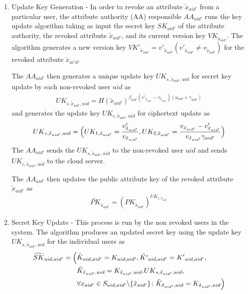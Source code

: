 \begin{enumerate}
	
	\begin{enumerate}
		\item Update Key Generation - In order to revoke an attribute $\tilde{x}_{aid'}$ from a particular user, the attribute authority (AA) responsible $AA_{aid'}$ runs the key update algorithm taking as input the secret key $SK_{aid'}$ of the 
		attribute authority, the revoked attribute $\tilde{x}_{aid'}$, and its current version key $VK_{\tilde{x}_{aid'}}$.
		The algorithm generates a new version key $VK'_{\tilde{x}_{aid'}} = v'_{\tilde{x}_{aid'}} (v'_{\tilde{x}_{aid'}} \neq v_{\tilde{x}_{aid'}})$ for the revoked attribute $\tilde{x}_{ai'd}$.
		
		The $AA_{aid'}$ then generates a unique update key ${UK}_{s,\tilde{x}_{aid'},uid}$ for secret key update by each non-revoked user $uid$ as
		\begin{align*}
		{UK}_{s,\tilde{x}_{aid'},uid} = H(\tilde{x}_{aid'})^{\beta_{aid'}(v'_{\tilde{x}_{aid'}}-v_{\tilde{x}_{aid'}})(u_{uid}+\gamma_{aid'})}
		\end{align*}
		and generates the update key ${UK}_{c,\tilde{x}_{aid'},uid}$ for ciphertext update as
		\begin{align*}
		{UK}_{c,\tilde{x}_{aid'},uid} =\Bigl( UK_{1,\tilde{x}_{aid'}} = \frac{v'_{\tilde{x}_{aid'}}}{v_{\tilde{x}_{aid'}}}, UK_{2,\tilde{x}_{aid'}} = \frac{v_{\tilde{x}_{aid'}} - v'_{\tilde{x}_{aid'}}}{v_{\tilde{x}_{aid'}}\gamma_{aid'}} \Bigl)
		\end{align*}
		The $AA_{aid'}$ sends the ${UK}_{s,\tilde{x}_{aid'},uid}$ to the non-revoked user $uid$ and sends ${UK}_{c,\tilde{x}_{aid'},uid}$ to the cloud server.
		
		The $AA_{aid'}$ then updates the public attribute key of the revoked attribute $\tilde{x}_{aid'}$ as
		\begin{align*}
		\widetilde{PK}_{\tilde{x}_{aid'}} = ({PK}_{\tilde{x}_{aid'}})^{UK_{1,\tilde{x}_{aid'}}}
		\end{align*}
		
		
		\item Secret Key Update - This process is run by the non revoked users in the system. The algorithm produces an updated secret key using the update key ${UK}_{s,\tilde{x}_{aid'},uid}$ for the individual users as
		\begin{align*}
		\widetilde{SK}_{uid,aid'} = \Bigl(&\tilde{K}_{uid,aid'} = {K}_{uid,aid'},\tilde{K'}_{uid,aid'} = {K'}_{uid,aid'},\\
		&\tilde{K}_{\tilde{x}_{aid'},uid} = {K}_{\tilde{x}_{aid'},uid}.{UK}_{s,\tilde{x}_{aid'},uid},\\
		&\forall x_{aid'} \in S_{uid,aid'} \backslash \{ \tilde{x}_{aid'} \} \colon \tilde{K}_{\tilde{x}_{aid'},uid} = {K}_{\tilde{x}_{aid'},uid}  \Bigl) 
		\end{align*}
		

\end{enumerate}
\end{enumerate}
